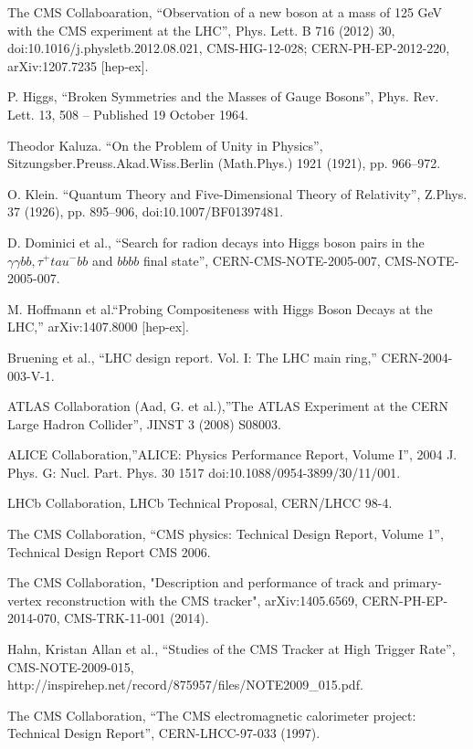 \begin{thebibliography}{99}
The CMS Collaboaration, ``Observation of a new boson at a mass of 125 GeV with the CMS experiment at the LHC'', Phys. Lett. B 716 (2012) 30, doi:10.1016/j.physletb.2012.08.021, CMS-HIG-12-028; CERN-PH-EP-2012-220, arXiv:1207.7235 [hep-ex].

P. Higgs, ``Broken Symmetries and the Masses of Gauge Bosons'', Phys. Rev. Lett. 13, 508 – Published 19 October 1964.

Theodor Kaluza. “On the Problem of Unity in Physics”, Sitzungsber.Preuss.Akad.Wiss.Berlin (Math.Phys.) 1921 (1921), pp. 966–972.

O. Klein. “Quantum Theory and Five-Dimensional Theory of Relativity'', Z.Phys. 37 (1926), pp. 895–906, doi:10.1007/BF01397481.

D. Dominici et al., ``Search for radion decays into Higgs boson pairs in the $\gamma \gamma b b,\tau^+ tau^- b b$ and $bbbb$ final state'', CERN-CMS-NOTE-2005-007, CMS-NOTE-2005-007.

 M. Hoffmann et al.``Probing Compositeness with Higgs Boson Decays at the LHC,''
  arXiv:1407.8000 [hep-ex].
  
Bruening et al., “LHC design report. Vol. I: The LHC main ring,” CERN-2004-003-V-1.

ATLAS Collaboration (Aad, G. et al.),''The ATLAS Experiment at the CERN Large Hadron Collider'', JINST 3 (2008) S08003.

ALICE Collaboration,''ALICE: Physics Performance Report, Volume I'', 2004 J. Phys. G: Nucl. Part. Phys. 30 1517 doi:10.1088/0954-3899/30/11/001.

LHCb Collaboration, LHCb Technical Proposal, CERN/LHCC 98-4.

 The CMS Collaboration, ``CMS physics: Technical Design Report, Volume 1'', Technical Design Report CMS 2006.

The CMS Collaboration, "Description and performance of track and primary-vertex reconstruction with the CMS tracker", arXiv:1405.6569, CERN-PH-EP-2014-070, CMS-TRK-11-001 (2014).

Hahn, Kristan Allan et al., ``Studies of the CMS Tracker at High Trigger Rate'', CMS-NOTE-2009-015, http://inspirehep.net/record/875957/files/NOTE2009\_015.pdf.

The CMS Collaboration, “The CMS electromagnetic calorimeter project: Technical Design Report”, CERN-LHCC-97-033 (1997).


\end{thebibliography}
